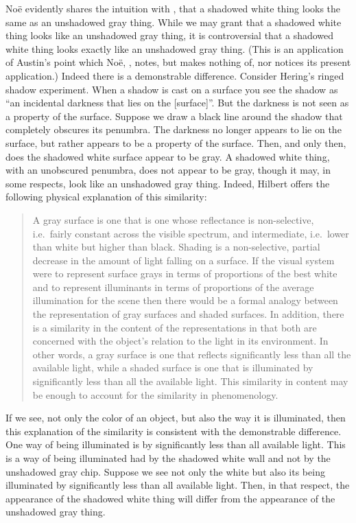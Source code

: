 \documentclass[12pt]{article}
\begin{document}
Noë evidently shares the intuition with \citet[88]{Chalmers:2006kx}, that a shadowed white thing looks the same as an unshadowed gray thing. While we may grant that a shadowed white thing looks like an unshadowed gray thing, it is controversial that a shadowed white thing looks exactly like an unshadowed gray thing. (This is an application of Austin's point which Noë, \citeyear[80]{Noe:2004fk}, notes, but makes nothing of, nor notices its present application.) Indeed there is a demonstrable difference. Consider Hering's \citeyearpar[8]{Hering:1920ty} ringed shadow experiment. When a shadow is cast on a surface you see the shadow as ``an incidental darkness that lies on the [surface]''. But the darkness is not seen as a property of the surface. Suppose we draw a black line around the shadow that completely obscures its penumbra. The darkness no longer appears to lie on the surface, but rather appears to be a property of the surface. Then, and only then, does the shadowed white surface appear to be gray. A shadowed white thing, with an unobscured penumbra, does not appear to be gray, though it may, in some respects, look like an unshadowed gray thing. Indeed, Hilbert offers the following physical explanation of this similarity:
	\begin{quote}
		A gray surface is one that is one whose reflectance is non-selective, i.e.\ fairly constant across the visible spectrum, and intermediate, i.e.\ lower than white but higher than black. Shading is a non-selective, partial decrease in the amount of light falling on a surface. If the visual system were to represent surface grays in terms of proportions of the best white and to represent illuminants in terms of proportions of the average illumination for the scene then there would be a formal analogy between the representation of gray surfaces and shaded surfaces. In addition, there is a similarity in the content of the representations in that both are concerned with the object’s relation to the light in its environment. In other words, a gray surface is one that reflects significantly less than all the available light, while a shaded surface is one that is illuminated by significantly less than all the available light. This similarity in content may be enough to account for the similarity in phenomenology. \citep[xx]{Hilbert:2007qy}
	\end{quote}
If we see, not only the color of an object, but also the way it is illuminated, then this explanation of the similarity is consistent with the demonstrable difference. One way of being illuminated is by significantly less than all available light. This is a way of being illuminated had by the shadowed white wall and not by the unshadowed gray chip. Suppose we see not only the white but also its being illuminated by significantly less than all available light. Then, in that respect, the appearance of the shadowed white thing will differ from the appearance of the unshadowed gray thing.
\end{document}
